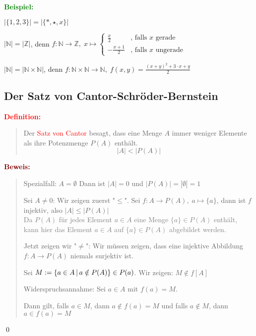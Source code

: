 \documentclass{article}
\newcommand{\smsp}{\phantom{\hspace{3px}}}
\newcommand{\red}[1]{\textcolor{red}{#1}}
\newcommand{\gray}[1]{\textcolor{gray}{#1}}
\newcommand{\green}[1]{\textcolor{green}{#1}}
\newcommand{\maroon}[1]{\textcolor{maroon}{#1}}
\newcommand{\ex}{\green{\textbf{Beispiel: }}}
\newcommand{\de}[1]{\red{\textbf{Definition: }}\begin{quote}#1\end{quote}}
\newcommand{\pr}[1]{\maroon{\textbf{Beweis: }}\begin{quote}#1\end{quote}\qed}
\newcommand{\N}{\mathbb{N}}
\newcommand{\Z}{\mathbb{Z}}
\newcommand{\vst}{\smsp \vline \smsp}
\begin{document}
\ex \begin{itemize}
    \item $|\{1, 2, 3\}| = |\{*, \star, x\}|$

    \begin{minipage}{9.1cm}
        \item $|\N| = |\Z|$, denn $f: \N \to \Z, \; x \mapsto
        \begin{cases}
            \frac{x}{2} & \text{, falls } x \text{ gerade}\\
            -\frac{x + 1}{2} & \text{, falls } x \text{ ungerade}
        \end{cases}$
    \end{minipage}
    \begin{minipage}{2cm}
    \end{minipage}
    \item $|\N| = |\N \times \N|$, denn $f: \N \times \N \to \N, \; f(x,y) = \frac{(x + y)^2 + 3 \cdot x + y}{2}$
\end{itemize}

\subsection{Der Satz von Cantor-Schröder-Bernstein}
\de{Der \red{Satz von Cantor} besagt, dass eine Menge $A$ immer weniger Elemente als ihre Potenzmenge $P(A)$ enthält.
\begin{equation*}
    |A| < |P(A)|
\end{equation*}
}
\pr{
    Spezialfall: $A = \emptyset$
    Dann ist $|A| = 0$ und $|P(A)| = |{\emptyset}| = 1$

    Sei $A \neq 0$:
    Wir zeigen zuerst "$\leq$". Sei $f: A \to P(A), \; a \mapsto \{a\}$, dann ist $f$ injektiv, also $|A| \leq |P(A)|$\\
    \gray{Da $P(A)$ für jedes Element $a \in A$ eine Menge $\{a\} \in P(A)$ enthält, kann hier das Element $a \in A$ auf $\{a\} \in P(A)$ abgebildet werden.}

    Jetzt zeigen wir "$\neq$": Wir müssen zeigen, dass eine injektive Abbildung $f: A \to P(A)$ niemals surjektiv ist.

    Sei $M := \{a \in A \vst a \notin P(A)\} \in P(a)$. Wir zeigen: $M \notin f[A]$

    Widerspruchsannahme: Sei $a \in A$ mit $f(a) = M$.

    Dann gilt, falls $a \in M$, dann $a \notin f(a) = M$ und falls $a \notin M$, dann $a \in f(a) =M$
}
\end{document}
